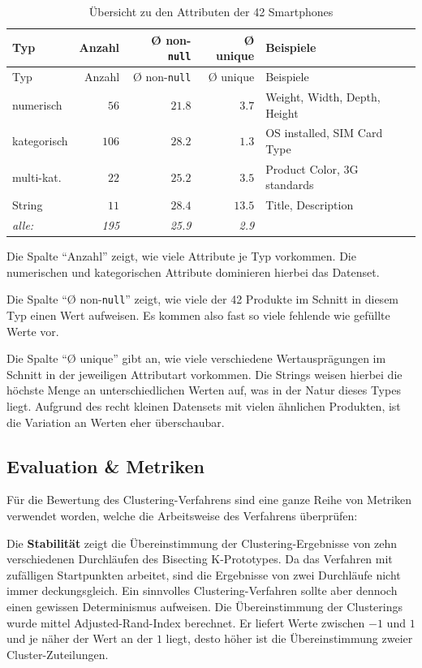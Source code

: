 \begin{longtable}[]{@{}lrrrl@{}}
\caption{Übersicht zu den Attributen der 42 Smartphones}\tabularnewline
\toprule()
Typ & Anzahl & Ø non-\texttt{null} & Ø unique & Beispiele \\
\midrule()
\endfirsthead
\toprule()
Typ & Anzahl & Ø non-\texttt{null} & Ø unique & Beispiele \\
\midrule()
\endhead
numerisch & \(56\) & \(21.8\) & \(3.7\) & Weight, Width, Depth,
Height \\
kategorisch & \(106\) & \(28.2\) & \(1.3\) & OS installed, SIM Card
Type \\
multi-kat. & \(22\) & \(25.2\) & \(3.5\) & Product Color, 3G
standards \\
String & \(11\) & \(28.4\) & \(13.5\) & Title, Description \\
\emph{alle:} & \emph{195} & \emph{25.9} & \emph{2.9} & \\
\bottomrule()
\end{longtable}

Die Spalte ``Anzahl'' zeigt, wie viele Attribute je Typ vorkommen. Die
numerischen und kategorischen Attribute dominieren hierbei das Datenset.

Die Spalte ``Ø non-\texttt{null}'' zeigt, wie viele der 42 Produkte im
Schnitt in diesem Typ einen Wert aufweisen. Es kommen also fast so viele
fehlende wie gefüllte Werte vor.

Die Spalte ``Ø unique'' gibt an, wie viele verschiedene Wertausprägungen
im Schnitt in der jeweiligen Attributart vorkommen. Die Strings weisen
hierbei die höchste Menge an unterschiedlichen Werten auf, was in der
Natur dieses Types liegt. Aufgrund des recht kleinen Datensets mit
vielen ähnlichen Produkten, ist die Variation an Werten eher
überschaubar.

\hypertarget{evaluation-metriken}{%
\subsection{Evaluation \& Metriken}\label{evaluation-metriken}}

Für die Bewertung des Clustering-Verfahrens sind eine ganze Reihe von
Metriken verwendet worden, welche die Arbeitsweise des Verfahrens
überprüfen:

Die \textbf{Stabilität} zeigt die Übereinstimmung der
Clustering-Ergebnisse von zehn verschiedenen Durchläufen des Bisecting
K-Prototypes. Da das Verfahren mit zufälligen Startpunkten arbeitet,
sind die Ergebnisse von zwei Durchläufe nicht immer deckungsgleich. Ein
sinnvolles Clustering-Verfahren sollte aber dennoch einen gewissen
Determinismus aufweisen. Die Übereinstimmung der Clusterings wurde
mittel Adjusted-Rand-Index \autocite{hubert1985} berechnet. Er liefert
Werte zwischen \(-1\) und \(1\) und je näher der Wert an der \(1\)
liegt, desto höher ist die Übereinstimmung zweier Cluster-Zuteilungen.

